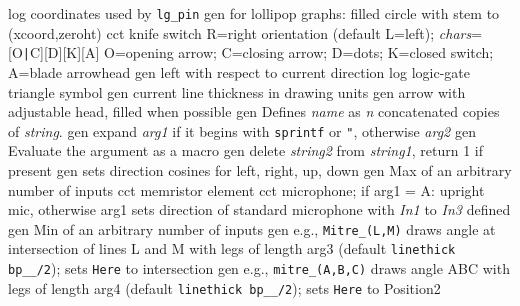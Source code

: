   {log}
  {coordinates used by {\tt lg\_pin}}
  {gen}
  {for lollipop graphs: filled circle with stem to (xcoord,zeroht)}
  {cct}
  {knife switch R=right orientation (default L=left);
    {\sl chars}=[O{\tt|}C][D][K][A] O=opening arrow; C=closing arrow; D=dots;
    K=closed switch; A=blade arrowhead }
  {gen}
  {left with respect to current direction}
  {log}
  {logic-gate triangle symbol}
  {gen}
  {current line thickness in drawing units}
%
  {gen}
  {arrow with adjustable head, filled when possible}
  {gen}
  {Defines {\sl name} as {\sl n} concatenated copies of {\sl string}.}
  {gen}
  {expand {\sl arg1} if it begins
    with {\tt sprintf} or {\tt "}, otherwise {\sl arg2}}
  {gen}
  {Evaluate the argument as a macro}
  {gen}
  {delete {\sl string2} from {\sl string1}, return 1 if present}
  {gen}
  {sets direction cosines for left, right, up, down}
  {gen}
  {Max of an arbitrary number of inputs}
  {cct}
  {memristor element}
  {cct}
  {microphone; if arg1 = A: upright mic, otherwise arg1 sets direction
   of standard microphone with
   {\sl In1} to {\sl In3} defined
   }
  {gen}
  {Min of an arbitrary number of inputs}
  {gen}
  {e.g., {\tt Mitre\_(L,M)} draws angle at intersection of lines
   L and M with legs of length arg3 (default {\tt linethick bp\_\_/2});
   sets {\tt Here} to intersection
    }
  {gen}
  {e.g., {\tt mitre\_(A,B,C)} draws angle ABC with legs
   of length arg4 (default {\tt linethick bp\_\_/2});
   sets {\tt Here} to Position2
    }
